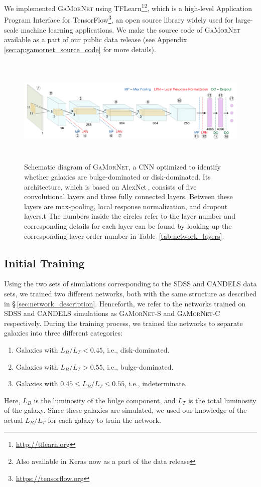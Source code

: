 \documentclass[twocolumn]{aastex63}
\newcommand\gamornet{G\textsc{a}M\textsc{or}N\textsc{et}}
\begin{document}
We implemented \gamornet{} using TFLearn\footnote{\href{http://tflearn.org}{http://tflearn.org}}\footnote{Also available in Keras now as a part of the data release}, which is a high-level Application Program Interface for TensorFlow\footnote{\href{https://tensorflow.org}{https://tensorflow.org}}, an open source library widely used for large-scale machine learning applications. We make the source code of \gamornet{} available as a part of our public data release (see Appendix\,\ref{sec:ap:gamornet_source_code} for more details).

\begin{figure}[htb]
    \centering
    \includegraphics[width = \textwidth, height= 5.2cm]{galmnet_schematic_coloured.pdf}
    \caption{Schematic diagram of \gamornet{}, a CNN optimized to identify whether galaxies are bulge-dominated or disk-dominated. Its architecture, which is based on AlexNet\,\citep{alexnet}, consists of five convolutional layers and three fully connected layers. Between these layers are max-pooling, local response normalization, and dropout layers.t The numbers inside the circles refer to the layer number and corresponding details for each layer can be found by looking up the corresponding layer order number in Table~\ref{tab:network_layers}. }
    \label{fig:galmnet_schematic}
\end{figure}

\subsection{Initial Training} \label{sec:initial_training}
 Using the two sets of simulations corresponding to the SDSS and CANDELS data sets, we trained two different networks, both with the same structure as described in \S\,\ref{sec:network_description}. Henceforth, we refer to the networks trained on SDSS and CANDELS simulations as \gamornet{}-S and \gamornet{}-C respectively. During the training process, we trained the networks to separate galaxies into three different categories:
\begin{enumerate}[noitemsep]
\item Galaxies with $L_B/L_T < 0.45 $, i.e., disk-dominated.
\item Galaxies with $L_B/L_T > 0.55 $, i.e., bulge-dominated.
\item Galaxies with $ 0.45 \leq L_B/L_T \leq 0.55 $, i.e., indeterminate.
\end{enumerate}
Here, $L_B$ is the luminosity of the bulge component, and $L_T$ is the total luminosity of the galaxy. Since these galaxies are simulated, we used our knowledge of the actual $L_B/L_T$ for each galaxy to train the network.
\end{document}
